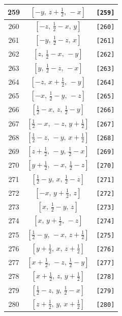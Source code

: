 \documentclass[fleqn,8pt]{jsarticle}
\begin{document}
\begin{longtable}{ccc}
259 & $\left[ - y,\, z + \frac{1}{2},\, - x \right]$ & {\tt [259]} \\ \hline
260 & $\left[ - z,\, \frac{1}{2} - x,\, y \right]$ & {\tt [260]} \\ \hline
261 & $\left[ - y,\, \frac{1}{2} - z,\, x \right]$ & {\tt [261]} \\ \hline
262 & $\left[ z,\, \frac{1}{2} - x,\, - y \right]$ & {\tt [262]} \\ \hline
263 & $\left[ y,\, \frac{1}{2} - z,\, - x \right]$ & {\tt [263]} \\ \hline
264 & $\left[ - z,\, x + \frac{1}{2},\, - y \right]$ & {\tt [264]} \\ \hline
265 & $\left[ - x,\, \frac{1}{2} - y,\, - z \right]$ & {\tt [265]} \\ \hline
266 & $\left[ \frac{1}{2} - x,\, z,\, \frac{1}{2} - y \right]$ & {\tt [266]} \\ \hline
267 & $\left[ \frac{1}{2} - x,\, - z,\, y + \frac{1}{2} \right]$ & {\tt [267]} \\ \hline
268 & $\left[ \frac{1}{2} - z,\, - y,\, x + \frac{1}{2} \right]$ & {\tt [268]} \\ \hline
269 & $\left[ z + \frac{1}{2},\, - y,\, \frac{1}{2} - x \right]$ & {\tt [269]} \\ \hline
270 & $\left[ y + \frac{1}{2},\, - x,\, \frac{1}{2} - z \right]$ & {\tt [270]} \\ \hline
271 & $\left[ \frac{1}{2} - y,\, x,\, \frac{1}{2} - z \right]$ & {\tt [271]} \\ \hline
272 & $\left[ - x,\, y + \frac{1}{2},\, z \right]$ & {\tt [272]} \\ \hline
273 & $\left[ x,\, \frac{1}{2} - y,\, z \right]$ & {\tt [273]} \\ \hline
274 & $\left[ x,\, y + \frac{1}{2},\, - z \right]$ & {\tt [274]} \\ \hline
275 & $\left[ \frac{1}{2} - y,\, - x,\, z + \frac{1}{2} \right]$ & {\tt [275]} \\ \hline
276 & $\left[ y + \frac{1}{2},\, x,\, z + \frac{1}{2} \right]$ & {\tt [276]} \\ \hline
277 & $\left[ x + \frac{1}{2},\, - z,\, \frac{1}{2} - y \right]$ & {\tt [277]} \\ \hline
278 & $\left[ x + \frac{1}{2},\, z,\, y + \frac{1}{2} \right]$ & {\tt [278]} \\ \hline
279 & $\left[ \frac{1}{2} - z,\, y,\, \frac{1}{2} - x \right]$ & {\tt [279]} \\ \hline
280 & $\left[ z + \frac{1}{2},\, y,\, x + \frac{1}{2} \right]$ & {\tt [280]} \\ \hline

\end{longtable}
\end{document}
